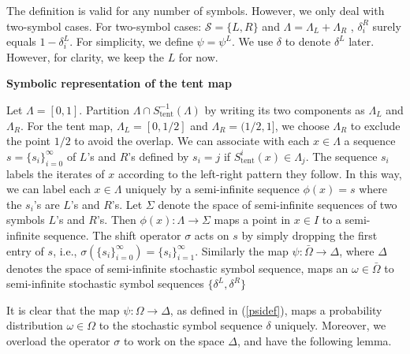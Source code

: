 The definition is valid for any number of symbols. However, we only deal with two-symbol cases. For two-symbol cases: $\mathcal{S} = \{L,R\}$ and $\Lambda= \Lambda_L +\Lambda_R  $ , $\delta_i^R$ surely equals $1-\delta_i^L $. For simplicity, we
define $\psi = \psi^L$. We use $\delta$ to denote $\delta^L$ later. However, for clarity, we keep the $L$ for now. 


\begin{example} \textbf{Symbolic representation of the tent map}

Let $\Lambda=[0, 1]$. Partition $\Lambda \cap S^{-1}_{\text{tent}}(\Lambda)$ by writing its two
components as $\Lambda_L$ and $\Lambda_R$. For the tent map, $\Lambda_L=[0, 1/2]$ and $\Lambda_R=(1/2,1]$, we choose $\Lambda_R$ to exclude the point $1/2$ to avoid the overlap. We can associate with
each $x \in \Lambda $ a sequence $s = \{s_i \}_{i=0}^{\infty}$ of $L$'s and $R$'s defined by
$s_i=j$ if $S_{\text{tent}}^i(x) \in \Lambda_j$. The sequence ${s_i}$ labels the iterates of $x$
according to the left-right pattern they follow. In this way, we can label each $x \in \Lambda$
uniquely by a semi-infinite sequence $\phi(x)=s$ where the $s_i$'s are $L$'s and $R$'s. Let
$\Sigma$ denote the space of semi-infinite sequences of two symbols $L$'s and $R$'s. Then
$\phi(x): \Lambda \to \Sigma$ maps a point in $x\in I$ to a semi-infinite sequence.
The shift operator $\sigma$ acts on $s$ by simply dropping the first entry of $s$, i.e.,
$\sigma(\{s_i\}_{i=0}^{\infty})=\{s_i\}_{i=1}^{\infty}$. Similarly the map $\psi: \bar{\Omega}
\to \Delta$, where $\Delta$ denotes the space of semi-infinite stochastic
symbol sequence, maps an $\omega \in \bar{\Omega}$ to semi-infinite stochastic symbol sequences $\{
\delta^L,\delta^R\}$

\end{example}

It is clear that the map $\psi: \Omega \to \Delta $, as defined in
(\ref{psidef}), maps a probability distribution $\omega \in \Omega$ to the stochastic symbol
sequence $\delta$ uniquely. Moreover,  we overload the operator $\sigma$ to work
on the space $\Delta$, and have the following lemma.

